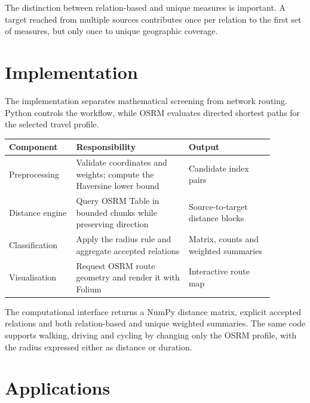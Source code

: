 \documentclass[a0,portrait]{a0poster}
\begin{document}
\begin{multicols}{2}
The distinction between relation-based and unique measures is important. A
target reached from multiple sources contributes once per relation to the first
set of measures, but only once to unique geographic coverage.


\section*{Implementation}

The implementation separates mathematical screening from network routing.
Python controls the workflow, while OSRM evaluates directed shortest paths for
the selected travel profile.

\begin{center}
\begin{tabular}{L{0.22\linewidth} L{0.37\linewidth} L{0.29\linewidth}}
\toprule
\textbf{Component} & \textbf{Responsibility} & \textbf{Output} \\
\midrule
Preprocessing & Validate coordinates and weights; compute the Haversine lower bound & Candidate index pairs \\
Distance engine & Query OSRM Table in bounded chunks while preserving direction & Source-to-target distance blocks \\
Classification & Apply the radius rule and aggregate accepted relations & Matrix, counts and weighted summaries \\
Visualisation & Request OSRM route geometry and render it with Folium & Interactive route map \\
\bottomrule
\end{tabular}
\end{center}

The computational interface returns a NumPy distance matrix, explicit accepted
relations and both relation-based and unique weighted summaries. The same code
supports walking, driving and cycling by changing only the OSRM profile, with
the radius expressed either as distance or duration.


\section*{Applications}


\end{multicols}
\end{document}
